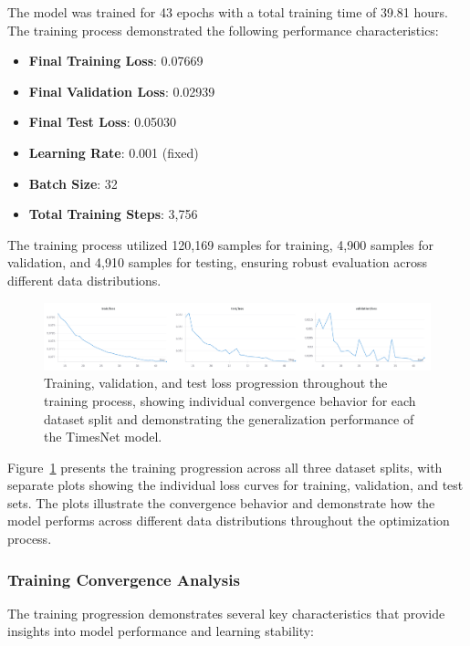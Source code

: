 The model was trained for 43 epochs with a total training time of 39.81 hours. The training process demonstrated the following performance characteristics:

\begin{itemize}
    \item \textbf{Final Training Loss}: 0.07669
    \item \textbf{Final Validation Loss}: 0.02939
    \item \textbf{Final Test Loss}: 0.05030
    \item \textbf{Learning Rate}: 0.001 (fixed)
    \item \textbf{Batch Size}: 32
    \item \textbf{Total Training Steps}: 3,756
\end{itemize}

The training process utilized 120,169 samples for training, 4,900 samples for validation, and 4,910 samples for testing, ensuring robust evaluation across different data distributions.

\begin{figure}[htbp]
\centering
\includegraphics[width=1.0\textwidth]{imgs/loss_funtions.png}
\caption{Training, validation, and test loss progression throughout the training process, showing individual convergence behavior for each dataset split and demonstrating the generalization performance of the TimesNet model.}
\label{fig:training_losses}
\end{figure}

Figure~\ref{fig:training_losses} presents the training progression across all three dataset splits, with separate plots showing the individual loss curves for training, validation, and test sets. The plots illustrate the convergence behavior and demonstrate how the model performs across different data distributions throughout the optimization process.

\subsubsection{Training Convergence Analysis}
\label{subsubsec:training_convergence}

The training progression demonstrates several key characteristics that provide insights into model performance and learning stability:

